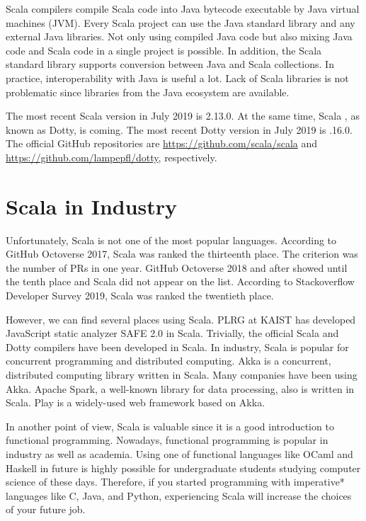 Scala compilers compile Scala code into Java bytecode executable by Java
virtual machines (JVM). Every Scala project can use the Java standard library
and any external Java libraries. Not only using compiled Java code but also
mixing Java code and Scala code in a single project is possible. In addition,
the Scala standard library supports
conversion
between Java  and
Scala collections. In practice, interoperability with Java is useful a lot.
Lack of Scala libraries is not problematic since libraries from the Java
ecosystem are available.

The most recent Scala version in July 2019 is 2.13.0. At the same time, Scala
, as known as Dotty, is coming. The most recent Dotty version in July 2019 is
.16.0. The official GitHub repositories are
\url{https://github.com/scala/scala}
and \url{https://github.com/lampepfl/dotty}, respectively.

\section{Scala in Industry}

Unfortunately, Scala is not one of the most popular languages. According to
GitHub Octoverse 2017,
Scala was ranked the thirteenth place. The criterion was
the number of PRs in one year.
GitHub Octoverse 2018
and after showed until the tenth place and Scala did not appear on the list.
According to Stackoverflow Developer Survey 2019,
Scala was ranked the twentieth place.

However, we can find several places using Scala. PLRG at KAIST has developed
JavaScript static analyzer
SAFE 2.0
in Scala. Trivially, the official Scala and Dotty compilers have been
developed in Scala. In industry, Scala is popular for concurrent programming
and distributed computing.
Akka is a concurrent,
distributed computing library written in Scala. Many companies have been using Akka.
Apache Spark, a well-known library for data
processing, also is written in Scala.
Play
is a widely-used web framework based on Akka.

In another point of view, Scala is valuable since it is a good introduction to
functional programming. Nowadays, functional programming is popular in
industry as well as academia. Using one of functional languages like OCaml and
Haskell in future is highly possible for undergraduate students studying
computer science of these days. Therefore, if you started programming with
imperative* languages like C, Java, and Python, experiencing Scala will
increase the choices of your future job.

